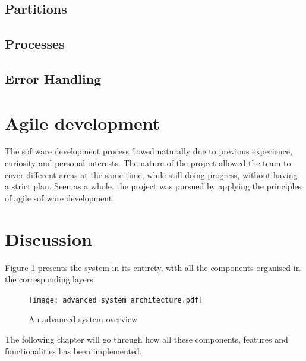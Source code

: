 \subsection{Partitions}

\subsection{Processes}

\subsection{Error Handling}

\section{Agile development}
The software development process flowed naturally due to previous 
experience, curiosity and personal interests. The nature of the project
allowed the team to cover different areas at the same time, while still
doing progress, without having a strict plan. Seen as a whole, the project
was pursued by applying the principles of agile software development.

\section{Discussion}

Figure \ref{fig:advanced_system} presents the system in its entirety,
with all the components organised in the corresponding layers.


\begin{figure}[H]
\centering
\texttt{[image: advanced\_system\_architecture.pdf]}

\caption{An advanced system overview}
\label{fig:advanced_system}
\end{figure}

The following chapter will go through how all these components,
features and functionalities has been implemented.
